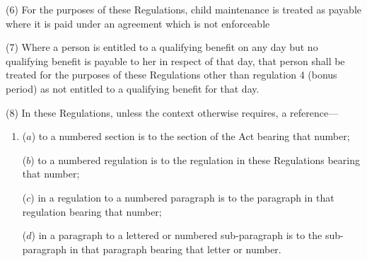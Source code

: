 \documentclass[12pt,a4paper]{article}
\begin{document}
(6) For the purposes of these Regulations, child maintenance is treated as payable where it is paid under an agreement which is not enforceable

(7) Where a person is entitled to a qualifying benefit on any day but no qualifying benefit is payable to her in respect of that day, that person shall be treated for the purposes of these Regulations 
other than regulation 4 (bonus period)  %
as not entitled to a qualifying benefit for that day.

(8) In these Regulations, unless the context otherwise requires, a reference—
\begin{enumerate}\item[]
($a$) to a numbered section is to the section of the Act bearing that number;

($b$) to a numbered regulation is to the regulation in these Regulations bearing that number;

($c$) in a regulation to a numbered paragraph is to the paragraph in that regulation bearing that number;

($d$) in a paragraph to a lettered or numbered sub-paragraph is to the sub-paragraph in that paragraph bearing that letter or number.
\end{enumerate}

\end{document}
